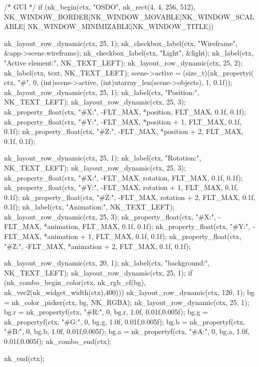 \documentclass[14pt,a4paper]{extarticle}
\theoremstyle{definition}
\renewcommand{\[}{\begin{singlespace}\begin{equation*}}
\renewcommand{\]}{\end{equation*}\end{singlespace}}
\begin{document}
\begin{multicols}{2}
\begin{ccode}
{{        /* GUI */
        if (nk_begin(ctx, "OSDO", nk_rect(4, 4, 256, 512),
            NK_WINDOW_BORDER|NK_WINDOW_MOVABLE|NK_WINDOW_SCALABLE|
            NK_WINDOW_MINIMIZABLE|NK_WINDOW_TITLE)) {
            nk_layout_row_dynamic(ctx, 25, 1);
            nk_checkbox_label(ctx, "Wireframe",
                              &app->scene.wireframe);
            nk_checkbox_label(ctx, "Light",
                              &light);
            nk_label(ctx, "Active element:", NK_TEXT_LEFT);
            nk_layout_row_dynamic(ctx, 25, 2);
            nk_label(ctx, text, NK_TEXT_LEFT);
            scene->active = (size_t)(nk_propertyi(
                                ctx, "#", 0, (int)scene->active,
                                (int)utarray_len(scene->objects), 1, 0.1f));
            nk_layout_row_dynamic(ctx, 25, 1);
            nk_label(ctx, "Position:", NK_TEXT_LEFT);
            nk_layout_row_dynamic(ctx, 25, 3);
            nk_property_float(ctx, "#X:", -FLT_MAX, *position,
                              FLT_MAX, 0.1f, 0.1f);
            nk_property_float(ctx, "#Y:", -FLT_MAX, *position + 1,
                              FLT_MAX, 0.1f, 0.1f);
            nk_property_float(ctx, "#Z:", -FLT_MAX, *position + 2,
                              FLT_MAX, 0.1f, 0.1f);

            nk_layout_row_dynamic(ctx, 25, 1);
            nk_label(ctx, "Rotation:", NK_TEXT_LEFT);
            nk_layout_row_dynamic(ctx, 25, 3);
            nk_property_float(ctx, "#X:", -FLT_MAX, rotation,
                              FLT_MAX, 0.1f, 0.1f);
            nk_property_float(ctx, "#Y:", -FLT_MAX, rotation + 1,
                              FLT_MAX, 0.1f, 0.1f);
            nk_property_float(ctx, "#Z:", -FLT_MAX, rotation + 2,
                              FLT_MAX, 0.1f, 0.1f);
            nk_label(ctx, "Animation:", NK_TEXT_LEFT);
            nk_layout_row_dynamic(ctx, 25, 3);
            nk_property_float(ctx, "#X:", -FLT_MAX, *animation,
                              FLT_MAX, 0.1f, 0.1f);
            nk_property_float(ctx, "#Y:", -FLT_MAX, *animation + 1,
                              FLT_MAX, 0.1f, 0.1f);
            nk_property_float(ctx, "#Z:", -FLT_MAX, *animation + 2,
                              FLT_MAX, 0.1f, 0.1f);

            nk_layout_row_dynamic(ctx, 20, 1);
            nk_label(ctx, "background:", NK_TEXT_LEFT);
            nk_layout_row_dynamic(ctx, 25, 1);
            if (nk_combo_begin_color(ctx, nk_rgb_cf(bg), nk_vec2(nk_widget_width(ctx),400))) {
                nk_layout_row_dynamic(ctx, 120, 1);
                bg = nk_color_picker(ctx, bg, NK_RGBA);
                nk_layout_row_dynamic(ctx, 25, 1);
                bg.r = nk_propertyf(ctx, "#R:", 0, bg.r, 1.0f, 0.01f,0.005f);
                bg.g = nk_propertyf(ctx, "#G:", 0, bg.g, 1.0f, 0.01f,0.005f);
                bg.b = nk_propertyf(ctx, "#B:", 0, bg.b, 1.0f, 0.01f,0.005f);
                bg.a = nk_propertyf(ctx, "#A:", 0, bg.a, 1.0f, 0.01f,0.005f);
                nk_combo_end(ctx);
            }
        }
        nk_end(ctx);

}}
\end{ccode}
\end{multicols}
\end{document}

